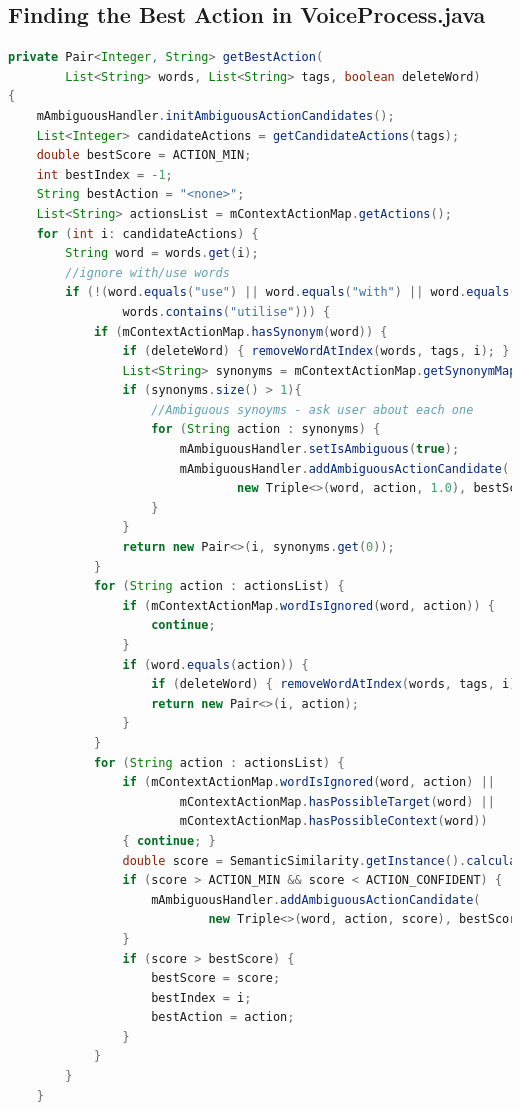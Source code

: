 \documentclass[11pt]{article}
\begin{document}
\newpage
\subsection{Finding the Best Action in VoiceProcess.java}
\label{appendix:bestActionJava}
\begin{lstlisting}[language=Java, caption=MainActivity.getBestAction()]
private Pair<Integer, String> getBestAction(
        List<String> words, List<String> tags, boolean deleteWord)
{
    mAmbiguousHandler.initAmbiguousActionCandidates();
    List<Integer> candidateActions = getCandidateActions(tags);
    double bestScore = ACTION_MIN;
    int bestIndex = -1;
    String bestAction = "<none>";
    List<String> actionsList = mContextActionMap.getActions();
    for (int i: candidateActions) {
        String word = words.get(i);
        //ignore with/use words
        if (!(word.equals("use") || word.equals("with") || word.equals("using") ||
                words.contains("utilise"))) {
            if (mContextActionMap.hasSynonym(word)) {
                if (deleteWord) { removeWordAtIndex(words, tags, i); }
                List<String> synonyms = mContextActionMap.getSynonymMapping(word);
                if (synonyms.size() > 1){
                    //Ambiguous synoyms - ask user about each one
                    for (String action : synonyms) {
                        mAmbiguousHandler.setIsAmbiguous(true);
                        mAmbiguousHandler.addAmbiguousActionCandidate(
                                new Triple<>(word, action, 1.0), bestScore);
                    }
                }
                return new Pair<>(i, synonyms.get(0));
            }
            for (String action : actionsList) {
                if (mContextActionMap.wordIsIgnored(word, action)) {
                    continue;
                }
                if (word.equals(action)) {
                    if (deleteWord) { removeWordAtIndex(words, tags, i); }
                    return new Pair<>(i, action);
                }
            }
            for (String action : actionsList) {
                if (mContextActionMap.wordIsIgnored(word, action) ||
                        mContextActionMap.hasPossibleTarget(word) ||
                        mContextActionMap.hasPossibleContext(word))
                { continue; }
                double score = SemanticSimilarity.getInstance().calculateScore(action, word);
                if (score > ACTION_MIN && score < ACTION_CONFIDENT) {
                    mAmbiguousHandler.addAmbiguousActionCandidate(
                            new Triple<>(word, action, score), bestScore);
                }
                if (score > bestScore) {
                    bestScore = score;
                    bestIndex = i;
                    bestAction = action;
                }
            }
        }
    }


\end{lstlisting}
\end{document}
